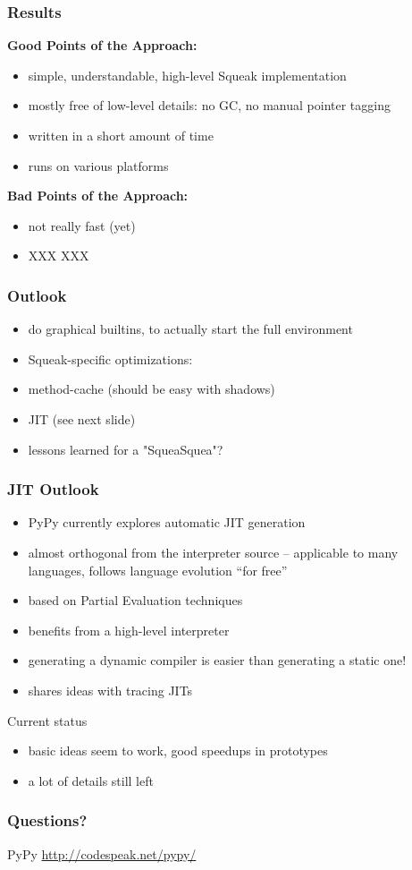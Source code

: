 \documentclass[utf8x]{beamer}
\begin{document}
\begin{frame}
    \frametitle{Results}
    {\bf Good Points of the Approach:}
    \begin{itemize}
    \item simple, understandable, high-level Squeak implementation
    \item mostly free of low-level details: no GC, no manual pointer tagging
    \item written in a short amount of time
    \item runs on various platforms
    \end{itemize}
    \pause
    {\bf Bad Points of the Approach:}
    \begin{itemize}
    \item not really fast (yet)
    \item XXX XXX
    \end{itemize}
\end{frame}

\begin{frame}
    \frametitle{Outlook}
    \begin{itemize}
    \item do graphical builtins, to actually start the full environment
    \item Squeak-specific optimizations:
    \item method-cache (should be easy with shadows)
    \item JIT (see next slide)
    \item lessons learned for a "SqueaSquea"?
    \end{itemize}
\end{frame}

\begin{frame}
    \frametitle{JIT Outlook}
    \begin{itemize}
    \item PyPy currently explores automatic JIT generation
    \item almost orthogonal from the interpreter source – applicable to many
          languages, follows language evolution ``for free''
    \item based on Partial Evaluation techniques
    \item benefits from a high-level interpreter
    \item generating a dynamic compiler is easier than generating a static one!
    \item shares ideas with tracing JITs
    \end{itemize}
    \pause
    \begin{block} {Current status}
        \begin{itemize}
        \item basic ideas seem to work, good speedups in prototypes
        \item a lot of details still left
        \end{itemize}
    \end{block}
\end{frame}

\begin{frame}
  \frametitle{Questions?}
  \begin{block}{
    PyPy}
    \bigskip
    \hskip 1cm \url{http://codespeak.net/pypy/}
    \bigskip
  \end{block}
\end{frame}
\end{document}
